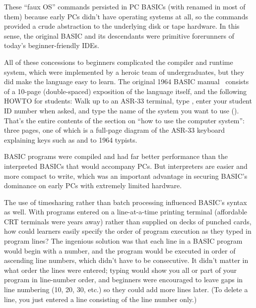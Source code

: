 
These ``faux OS'' commands persisted in PC BASICs (with  renamed
 in 
most of them) because early PCs didn't have operating systems at all, so
the commands provided a crude abstraction to the underlying disk or tape
hardware.
In this sense, the original BASIC and its descendants were primitive
forerunners of today's beginner-friendly IDEs.

All of these concessions to beginners complicated the compiler and
runtime system, which were
implemented by a heroic team of undergraduates,
but they did make the language easy to learn.
The original 1964 BASIC manual~\cite[p. 14]{dartmouth_basic_manual}
consists of a 10-page (double-spaced) exposition of the language
itself, and the following HOWTO for students:
Walk up to an ASR-33 terminal, type , enter your student ID
number when asked, and type the name of the system you want to use
().
That's the entire contents of the section on ``how to use the computer
system'': three pages, one of which is a full-page diagram of the ASR-33
keyboard explaining keys such as  and  to 1964
typists.

\begin{tangent}
  BASIC programs were compiled and had
  far better performance than the interpreted BASICs that would
  accompany PCs. But interpreters are easier and more compact to write, which
  was an important advantage in securing BASIC's dominance on
  early PCs with extremely limited hardware.
\end{tangent}


The use of timesharing rather than batch processing influenced
BASIC's syntax as well.
With programs entered on a line-at-a-time printing terminal (affordable CRT
terminals were years away) rather than supplied on decks of punched
cards, how could learners easily specify the order of program execution
as they typed in program lines?
The ingenious solution was that each line in a BASIC
program would begin with a number, and the program would be
executed in order of ascending line numbers, which didn't have to be
consecutive.  
It didn't matter in what order the lines were entered;
typing  would show
you all or part of your program in line-number order,
and beginners were encouraged to leave gaps in line
numbering (10, 20, 30, etc.) so they could add
more lines later.  (To delete a line, you just entered a line
consisting of the line number only.)

